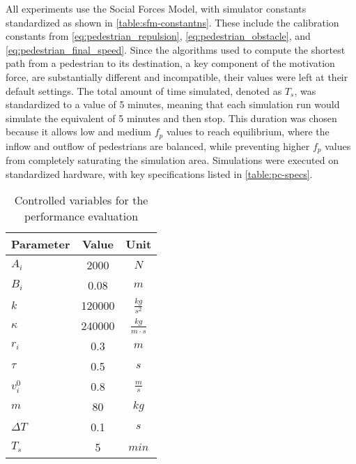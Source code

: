 \documentclass[twoside, 11pt]{article}
\begin{document}
All experiments use the Social Forces Model, with simulator constants standardized as shown in \autoref{table:sfm-constantns}. These include the calibration constants from \autoref{eq:pedestrian_repulsion}, \autoref{eq:pedestrian_obstacle}, and \autoref{eq:pedestrian_final_speed}. Since the algorithms used to compute the shortest path from a pedestrian to its destination, a key component of the motivation force, are substantially different and incompatible, their values were left at their default settings. The total amount of time simulated, denoted as $T_s$, was standardized to a value of 5 minutes, meaning that each simulation run would simulate the equivalent of 5 minutes and then stop. This duration was chosen because it allows low and medium $f_p$ values to reach equilibrium, where the inflow and outflow of pedestrians are balanced, while preventing higher $f_p$ values from completely saturating the simulation area. Simulations were executed on standardized hardware, with key specifications listed in \autoref{table:pc-specs}.

\begin{table}[h]
  \begin{center}
    \begin{tabular}{ | l | c | c | } 
      \hline
      Parameter & Value & Unit\\ 
      \hline 
      $A_i$ & 2000 & $N$\\
      \hline
      $B_i$ & 0.08 & $m$\\
      \hline
      $k$ & 120000 & $\frac{kg}{s^2}$\\
      \hline
      $\kappa$ & 240000 & $\frac{kg}{m \cdot s}$\\
      \hline
      $r_i$ & 0.3 & $m$\\
      \hline
      $\tau$ & 0.5 & $s$\\
      \hline
      $v_i^0$ & 0.8 & $\frac{m}{s}$\\
      \hline
      $m$ & 80 & $kg$\\
      \hline
      $\Delta T$ & 0.1 & $s$\\
      \hline 
      $T_s$ & 5 & $min$\\
      \hline 
    \end{tabular}
    \caption{Controlled variables for the performance evaluation}
    \label{table:sfm-constantns}
  \end{center}
\end{table}
\end{document}
